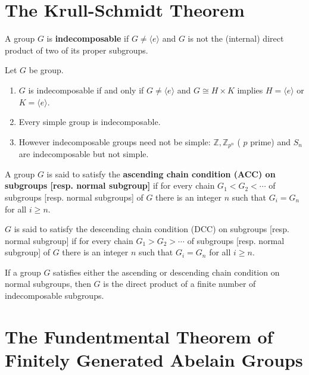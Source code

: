 \section{The Krull-Schmidt Theorem} %
\begin{definition}
    A group $G$ is \textbf{indecomposable} if $G \neq\langle e\rangle$ and $G$ is not the (internal) direct product of two of its proper subgroups.
\end{definition}
\begin{proposition}
    Let $G$ be group.
    \begin{enumerate}
        \item
              $G$ is indecomposable if and only if $G \neq\langle e\rangle$ and $G \cong H \times K$ implies $H=\langle e\rangle$ or $K=\langle e\rangle$.

        \item
              Every simple group is indecomposable.

        \item
              However indecomposable groups need not be simple: $\mathbb{Z}, \mathbb{Z}_{p^n}$ ( $p$ prime) and $S_n$ are indecomposable but not simple.
    \end{enumerate}
\end{proposition}
\begin{definition}
    A group $G$ is said to satisfy the \textbf{ascending chain condition (ACC) on  subgroups [resp. normal subgroup]} if for every chain $G_1<G_2<\cdots$ of subgroups [resp. normal subgroups] of $G$ there is an integer $n$ such that $G_i=G_n$ for all $i \geq n$.

    $G$ is said to satisfy the descending chain condition (DCC) on subgroups [resp. normal subgroup] if for every chain $G_1>G_2>\cdots$ of subgroups [resp. normal subgroup] of $G$ there is an integer $n$ such that $G_i=G_n$ for all $i\geq n$.
\end{definition}


\begin{theorem}
    If a group $G$ satisfies either the ascending or descending chain condition on normal subgroups, then $G$ is the direct product of a finite number of indecomposable subgroups.
\end{theorem}





\section{The Fundentmental Theorem of Finitely Generated Abelain Groups}




